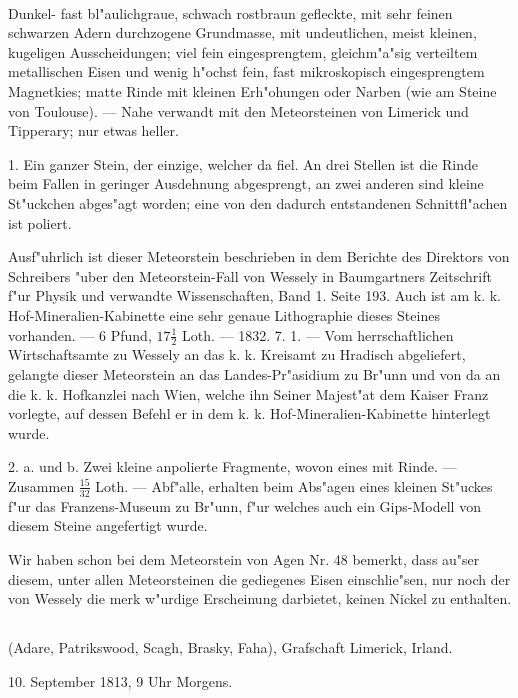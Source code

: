 \documentclass[a4paper, 11pt, oneside, polutonikogreek, german]{article}
\begin{document}
\paragraph{}
Dunkel- fast bl"aulichgraue, schwach rostbraun gefleckte, mit sehr feinen schwarzen Adern durchzogene Grundmasse, mit undeutlichen, meist kleinen, kugeligen Ausscheidungen; viel fein eingesprengtem, gleichm"a"sig verteiltem metallischen Eisen und wenig h"ochst fein, fast mikroskopisch eingesprengtem Magnetkies; matte Rinde mit kleinen Erh"ohungen oder Narben (wie am Steine von Toulouse). --- Nahe verwandt mit den Meteorsteinen von Limerick und Tipperary; nur etwas heller.

1. Ein ganzer Stein, der einzige, welcher da fiel. An drei Stellen ist die Rinde beim Fallen in geringer Ausdehnung abgesprengt, an zwei anderen sind kleine St"uckchen abges"agt worden; eine von den dadurch entstandenen Schnittfl"achen ist poliert.

Ausf"uhrlich ist dieser Meteorstein beschrieben in dem Berichte des Direktors von Schreibers "uber den Meteorstein-Fall von Wessely in Baumgartners Zeitschrift f"ur Physik und verwandte Wissenschaften, Band 1. Seite 193. Auch ist am k. k. Hof-Mineralien-Kabinette eine sehr genaue Lithographie dieses Steines vorhanden. --- 6 Pfund, $17\frac{1}{2}$ Loth. --- 1832. 7. 1. --- Vom herrschaftlichen Wirtschaftsamte zu Wessely an das k. k. Kreisamt zu Hradisch abgeliefert, gelangte dieser Meteorstein an das Landes-Pr"asidium zu Br"unn und von da an die k. k. Hofkanzlei nach Wien, welche ihn Seiner Majest"at dem Kaiser Franz vorlegte, auf dessen Befehl er in dem k. k. Hof-Mineralien-Kabinette hinterlegt wurde.

2. a. und b. Zwei kleine anpolierte Fragmente, wovon eines mit Rinde. --- Zusammen $\frac{15}{32}$ Loth. --- Abf"alle, erhalten beim Abs"agen eines kleinen St"uckes f"ur das Franzens-Museum zu Br"unn, f"ur welches auch ein Gips-Modell von diesem Steine angefertigt wurde.

\setlength{\leftskip}{10mm}
\setlength{\parindent}{0pt}

{\footnotesize Wir haben schon bei dem Meteorstein von Agen Nr. 48 bemerkt, dass au"ser diesem, unter allen Meteorsteinen die gediegenes Eisen einschlie"sen, nur noch der von Wessely die merk w"urdige Erscheinung darbietet, keinen Nickel zu enthalten.}

\setlength{\leftskip}{0pt}
\setlength{\parindent}{20pt}

\subsection{}
\begin{center}

(Adare, Patrikswood, Scagh, Brasky, Faha), Grafschaft Limerick, Irland.

10. September 1813, 9 Uhr Morgens.
\end{center}
\end{document}
